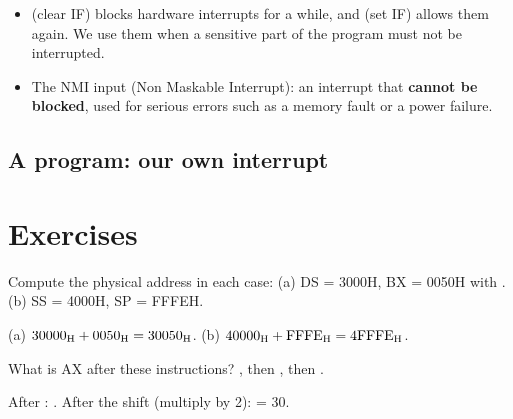 \begin{tarif}
    \begin{itemize}
        \item {} (clear IF) blocks hardware interrupts for a while, and  (set IF) allows them again.
              We use them when a sensitive part of the program must not be interrupted.
        \item The NMI input (Non Maskable Interrupt): an interrupt that \textbf{cannot be blocked}, used for serious
              errors such as a memory fault or a power failure.
    \end{itemize}
\end{tarif}

\subsection{A program: our own interrupt}

\begin{sharh}
\end{sharh}

\section{Exercises}

\begin{tamrin}
    Compute the physical address in each case: (a) DS = 3000H, BX = 0050H with .
    (b) SS = 4000H, SP = FFFEH.
\end{tamrin}
\begin{hall}
    (a) $\mbox{30000\textsubscript{H}} + \mbox{0050\textsubscript{H}} = \mbox{30050\textsubscript{H}}$. \quad (b) $\mbox{40000\textsubscript{H}} + \mbox{FFFE\textsubscript{H}} = \mbox{4FFFE\textsubscript{H}}$.
\end{hall}

\begin{tamrin}
    What is AX after these instructions? , then , then .
\end{tamrin}
\begin{hall}
    After : . After the shift (multiply by 2):  = 30.
\end{hall}

